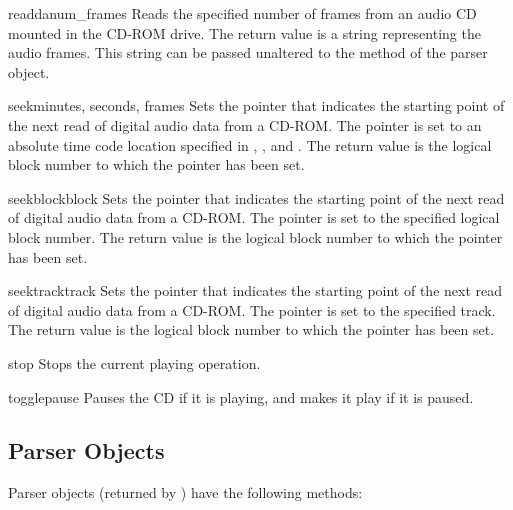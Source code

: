 \begin{methoddesc}[CD player]{readda}{num_frames}
Reads the specified number of frames from an audio CD mounted in the
CD-ROM drive.  The return value is a string representing the audio
frames.  This string can be passed unaltered to the
 method of the parser object.
\end{methoddesc}

\begin{methoddesc}[CD player]{seek}{minutes, seconds, frames}
Sets the pointer that indicates the starting point of the next read of
digital audio data from a CD-ROM.  The pointer is set to an absolute
time code location specified in , , and
.  The return value is the logical block number to which
the pointer has been set.
\end{methoddesc}

\begin{methoddesc}[CD player]{seekblock}{block}
Sets the pointer that indicates the starting point of the next read of
digital audio data from a CD-ROM.  The pointer is set to the specified
logical block number.  The return value is the logical block number to
which the pointer has been set.
\end{methoddesc}

\begin{methoddesc}[CD player]{seektrack}{track}
Sets the pointer that indicates the starting point of the next read of
digital audio data from a CD-ROM.  The pointer is set to the specified
track.  The return value is the logical block number to which the
pointer has been set.
\end{methoddesc}

\begin{methoddesc}[CD player]{stop}{}
Stops the current playing operation.
\end{methoddesc}

\begin{methoddesc}[CD player]{togglepause}{}
Pauses the CD if it is playing, and makes it play if it is paused.
\end{methoddesc}


\subsection{Parser Objects}
\label{cd-parser-objects}

Parser objects (returned by ) have the
following methods:

